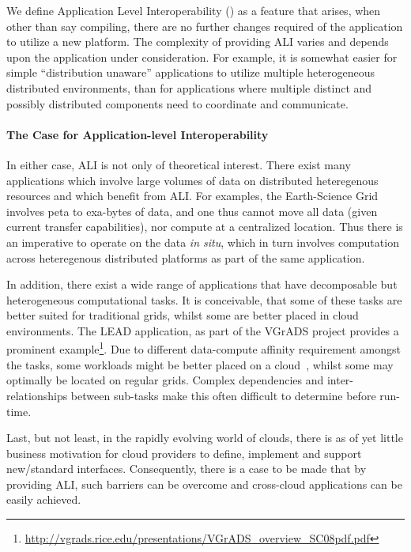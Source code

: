 \documentclass[3p,twocolumn]{elsarticle}
\begin{document}
We define Application Level Interoperability () as a feature
that arises, when other than say compiling, there are no further
changes required of the application to utilize a new platform.
The complexity of providing ALI varies and depends upon the
application under consideration.  For example, it is somewhat easier
for simple ``distribution unaware'' applications to utilize multiple
heterogeneous distributed environments, than for applications where
multiple distinct and possibly distributed components need to
coordinate and communicate.


\paragraph{The Case for Application-level Interoperability}

In either case, ALI is not only of theoretical interest. There exist
many applications which involve large volumes of data on distributed
heteregenous resources and which benefit from ALI. For examples, the
Earth-Science Grid involves peta to exa-bytes of data, and one thus
cannot move all data (given current transfer capabilities), nor
compute at a centralized location.  Thus there is an imperative to
operate on the data {\it in situ}, which in turn involves computation
across heteregenous distributed platforms as part of the same
application.

In addition, there exist a wide range of applications that have
decomposable but heterogeneous computational tasks. It is conceivable,
that some of these tasks are better suited for traditional grids,
whilst some are better placed in cloud environments.  The LEAD
application, as part of the VGrADS project provides a prominent
example\footnote{\url{http://vgrads.rice.edu/presentations/VGrADS_overview_SC08pdf.pdf}}.
Due to different data-compute affinity requirement amongst the tasks,
some workloads might be better placed on a cloud~\cite{jha_ccpe09},
whilst some may optimally be located on regular grids. Complex
dependencies and inter-relationships between sub-tasks make this often
difficult to determine before run-time.

Last, but not least, in the rapidly evolving world of clouds, there is
as of yet little business motivation for cloud providers to define,
implement and support new/standard interfaces. Consequently, there is
a case to be made that by providing ALI, such barriers can be overcome
and cross-cloud applications can be easily achieved.
\end{document}
